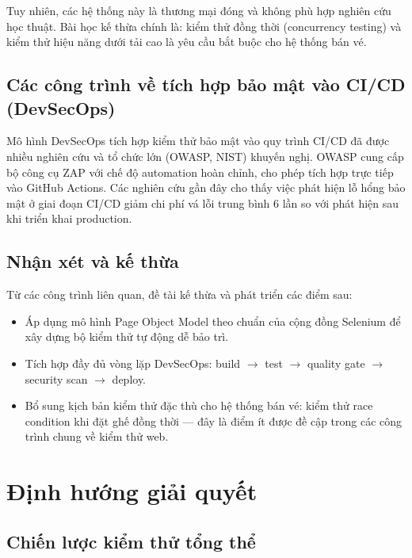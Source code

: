 \documentclass[../main.tex]{subfiles}
\begin{document}
Tuy nhiên, các hệ thống này là thương mại đóng và không phù hợp nghiên cứu học thuật. Bài học kế thừa chính là: kiểm thử đồng thời (concurrency testing) và kiểm thử hiệu năng dưới tải cao là yêu cầu bắt buộc cho hệ thống bán vé.

\subsection{Các công trình về tích hợp bảo mật vào CI/CD (DevSecOps)}

Mô hình DevSecOps tích hợp kiểm thử bảo mật vào quy trình CI/CD đã được nhiều nghiên cứu và tổ chức lớn (OWASP, NIST) khuyến nghị. OWASP cung cấp bộ công cụ ZAP với chế độ automation hoàn chỉnh, cho phép tích hợp trực tiếp vào GitHub Actions. Các nghiên cứu gần đây cho thấy việc phát hiện lỗ hổng bảo mật ở giai đoạn CI/CD giảm chi phí vá lỗi trung bình 6 lần so với phát hiện sau khi triển khai production.

\subsection{Nhận xét và kế thừa}

Từ các công trình liên quan, đề tài kế thừa và phát triển các điểm sau:

\begin{itemize}
    \item Áp dụng mô hình Page Object Model theo chuẩn của cộng đồng Selenium để xây dựng bộ kiểm thử tự động dễ bảo trì.
    \item Tích hợp đầy đủ vòng lặp DevSecOps: build $\rightarrow$ test $\rightarrow$ quality gate $\rightarrow$ security scan $\rightarrow$ deploy.
    \item Bổ sung kịch bản kiểm thử đặc thù cho hệ thống bán vé: kiểm thử race condition khi đặt ghế đồng thời — đây là điểm ít được đề cập trong các công trình chung về kiểm thử web.
\end{itemize}

\section{Định hướng giải quyết}

\subsection{Chiến lược kiểm thử tổng thể}
\end{document}
